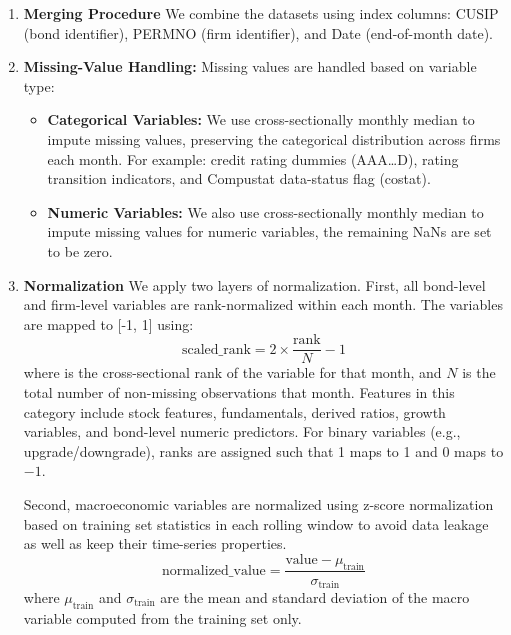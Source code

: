 \documentclass[12pt]{article}
\begin{document}
\begin{enumerate}
    \item \textbf{Merging Procedure}
    We combine the datasets using index columns: CUSIP (bond identifier), PERMNO (firm identifier), and Date (end-of-month date).

    \item \textbf{Missing-Value Handling: }
    Missing values are handled based on variable type:
    \begin{itemize}
        \item \textbf{Categorical Variables:} We use cross-sectionally monthly median to impute missing values, preserving the categorical distribution across firms each month. For example: credit rating dummies (AAA\dots D), rating transition indicators, and Compustat data-status flag (costat). 
        \item \textbf{Numeric Variables:} We also use cross-sectionally monthly median to impute missing values for numeric variables, the remaining NaNs are set to be zero.
    \end{itemize}

    \item \textbf{Normalization}
    We apply two layers of normalization.
    First, all bond-level and firm-level variables are rank-normalized within each month. The variables are mapped to [-1, 1] using:
        \begin{equation}
        \text{scaled\_rank} = 2 \times \frac{\text{rank}}{N} - 1
        \end{equation}
        where  is the cross-sectional rank of the variable for that month, and $N$ is the total number of non-missing observations that month. 
        Features in this category include stock features, fundamentals, derived ratios, growth variables, and bond-level numeric predictors. 
        For binary variables (e.g., upgrade/downgrade), ranks are assigned such that 1 maps to 1 and 0 maps to $-1$.

    Second, macroeconomic variables are normalized using z-score normalization based on training set statistics in each rolling window to avoid data leakage as well as keep their time-series properties. 
        \begin{equation}
        \text{normalized\_value} = \frac{\text{value} - \mu_{\text{train}}}{\sigma_{\text{train}}}
        \end{equation}
        where $\mu_{\text{train}}$ and $\sigma_{\text{train}}$ are the mean and standard deviation of the macro variable computed from the training set only.
\end{enumerate}
\end{document}
